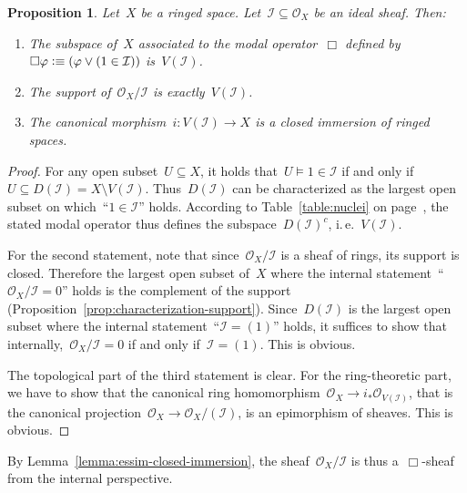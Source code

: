 \documentclass[10pt]{amsart}
\makeatletter
\theoremstyle{definition}
\theoremstyle{plain}
\newtheorem{prop}[defn]{Proposition}
\theoremstyle{remark}
\renewcommand{\O}{\mathcal{O}}
\newcommand{\I}{\mathcal{I}}
\newcommand{\?}{\,{:}\,}
\renewcommand{\_}{\mathpunct{.}\,}
\newcommand{\ie}{i.\,e.\@\xspace}
\newcommand{\defequiv}{\vcentcolon\equiv}
\makeatother
\begin{document}
\begin{prop}\label{prop:basics-closed-subspace}
Let~$X$ be a ringed space. Let~$\I \subseteq \O_X$ be an ideal
sheaf. Then:
\begin{enumerate}
\item The subspace of~$X$ associated to the modal operator~$\Box$ defined
by~$\Box\varphi \defequiv (\varphi \vee (1 \in \I))$ is~$V(\I)$.
\item The support of~$\O_X/\I$ is exactly~$V(\I)$.
\item The canonical morphism~$i : V(\I) \to X$ is a closed immersion
of ringed spaces.
\end{enumerate}\end{prop}
\begin{proof}For any open subset~$U \subseteq X$, it holds that~$U \models 1
\in \I$ if and only if~$U \subseteq D(\I) = X \setminus V(\I)$. Thus~$D(\I)$
can be characterized as the largest open subset on which~``$1 \in \I$'' holds.
According to Table~\ref{table:nuclei} on page~\pageref{table:nuclei}, the
stated modal operator thus defines the subspace~$D(\I)^c$, \ie~$V(\I)$.

For the second statement, note that since~$\O_X/\I$ is a sheaf of rings, its
support is closed. Therefore the largest open subset of~$X$ where the internal
statement~``$\O_X/\I = 0$'' holds is the complement of the support
(Proposition~\ref{prop:characterization-support}). Since~$D(\I)$ is the largest
open subset where the internal statement~``$\I = (1)$'' holds, it suffices to
show that internally,~$\O_X/\I = 0$ if and only if~$\I = (1)$. This is obvious.

The topological part of the third statement is clear. For the ring-theoretic
part, we have to show that the canonical ring homomorphism~$\O_X \to i_*
\O_{V(\I)}$, that is the canonical projection~$\O_X \to \O_X/(\I)$, is an
epimorphism of sheaves. This is obvious.
\end{proof}

By Lemma~\ref{lemma:essim-closed-immersion}, the sheaf~$\O_X/\I$ is
thus a~$\Box$-sheaf from the internal perspective.
\end{document}

